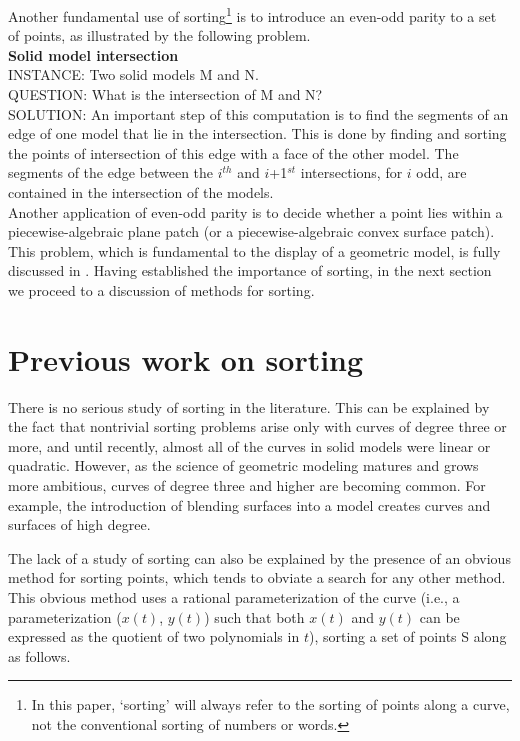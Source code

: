 Another fundamental use of sorting\footnote{In this paper, `sorting' will always
refer to 
the sorting of points along a curve, not the conventional sorting of numbers or
words.} is to introduce an even-odd parity to a
set of points, as illustrated by the following problem.\\[.25in]
%
{\bf Solid model intersection}\\
INSTANCE: Two solid models M and N.\\
QUESTION: What is the intersection of M and N?\\
SOLUTION: An important step of this computation
is to find the segments of an edge of one model that lie in the intersection.
This is done by finding and sorting the points of intersection 
of this edge with a face of the other model. 
The segments of the edge between the $i^{th}$ and $i$+1$^{st}$ intersections,
for $i$ odd, are contained in the intersection of the models.\\[.25in]
%
Another application of even-odd parity 
is to decide whether a point lies within a piecewise-algebraic plane patch
(or a piecewise-algebraic convex surface patch).
This problem, which is fundamental to the display of a geometric model, 
is fully discussed in \cite{jj}.
Having established the importance of sorting, in the next section 
we proceed to a discussion of methods for sorting.

\section{Previous work on sorting}
\label{sp}
%
There is no serious study of sorting in the literature.
This can be explained by the fact that nontrivial sorting problems
arise only with curves of degree three or more, and until recently, 
almost all of the curves in solid models were linear or quadratic.  
However, as the science of geometric modeling matures and grows more
ambitious, curves of degree three and higher are becoming common.
For example, the introduction of blending surfaces \cite{hh87}
into a model creates curves and surfaces of high degree.

The lack of a study of sorting can also be explained 
by the presence of an obvious method for sorting points, 
which tends to obviate a search for any other method.
This obvious method uses a rational parameterization of the curve
(i.e., a parameterization ($x(t)$, $y(t)$) such that both 
$x(t)$ and $y(t)$ can be expressed as the quotient of two polynomials in $t$),
sorting a set of points S along  as follows.

